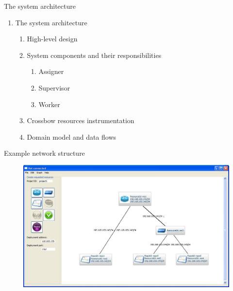 \documentclass{beamer}
\begin{document}
\setcounter{enumi_chapter}{\value{enumi}}


\begin{frame}{The system architecture}

	\begin{enumerate}
		\setcounter{enumi}{\value{enumi_chapter}}

		\item The system architecture

		\begin{enumerate}
			\item High-level design \pause
			\item System components and their responsibilities

				\begin{enumerate}
					\item Assigner
					\item Supervisor
					\item Worker
				\end{enumerate}

				\pause
			
			\item Crossbow resources instrumentation \pause
			\item Domain model and data flows
		\end{enumerate}

	\end{enumerate}

\end{frame}

\setcounter{enumi_chapter}{\value{enumi}}

\begin{frame}{Example network structure}
		
	\begin{figure}[H]
		\includegraphics[width=\textwidth]{img/network.jpg}
	\end{figure}

\end{frame}
\end{document}
